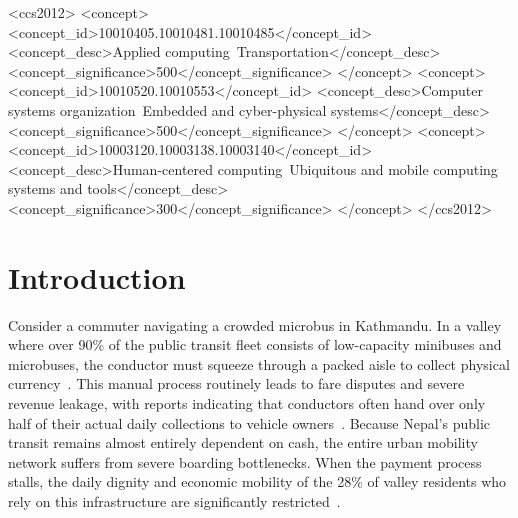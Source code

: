 \documentclass[manuscript,review,anonymous]{acmart}
\begin{document}
\begin{CCSXML}
  <ccs2012>
     <concept>
         <concept_id>10010405.10010481.10010485</concept_id>
         <concept_desc>Applied computing~Transportation</concept_desc>
         <concept_significance>500</concept_significance>
         </concept>
     <concept>
         <concept_id>10010520.10010553</concept_id>
         <concept_desc>Computer systems organization~Embedded and cyber-physical systems</concept_desc>
         <concept_significance>500</concept_significance>
         </concept>
     <concept>
         <concept_id>10003120.10003138.10003140</concept_id>
         <concept_desc>Human-centered computing~Ubiquitous and mobile computing systems and tools</concept_desc>
         <concept_significance>300</concept_significance>
         </concept>
   </ccs2012>
\end{CCSXML}
  




\maketitle

\section{Introduction}
Consider a commuter navigating a crowded microbus in Kathmandu.  In a valley where over 90\% of the public transit fleet consists of low-capacity minibuses and microbuses, the conductor must squeeze through a packed aisle to collect physical currency~\cite{jica2017kathmandu_transport,aryal2022strong}. This manual process routinely leads to fare disputes and severe revenue leakage, with reports indicating that conductors often hand over only half of their actual daily collections to vehicle owners~\cite{annapurnaexpress2026article}. Because Nepal's public transit remains almost entirely dependent on cash, the entire urban mobility network suffers from severe boarding bottlenecks. When the payment process stalls, the daily dignity and economic mobility of the 28\% of valley residents who rely on this infrastructure are significantly restricted~\cite{jica2017kathmandu_transport}.
\end{document}
